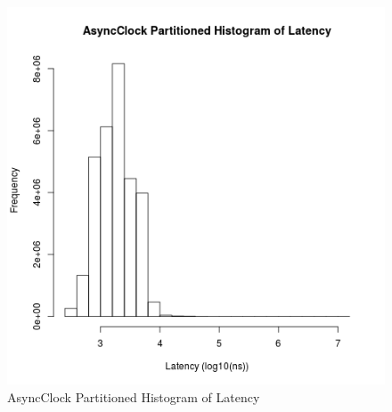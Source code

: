 \begin{figure}[H]
\center
\includegraphics[height=.4\textheight]{async_partitioned_latency_hist.png}
\caption{AsyncClock Partitioned Histogram of Latency}
\label{async_partitioned_latency}
\end{figure}


